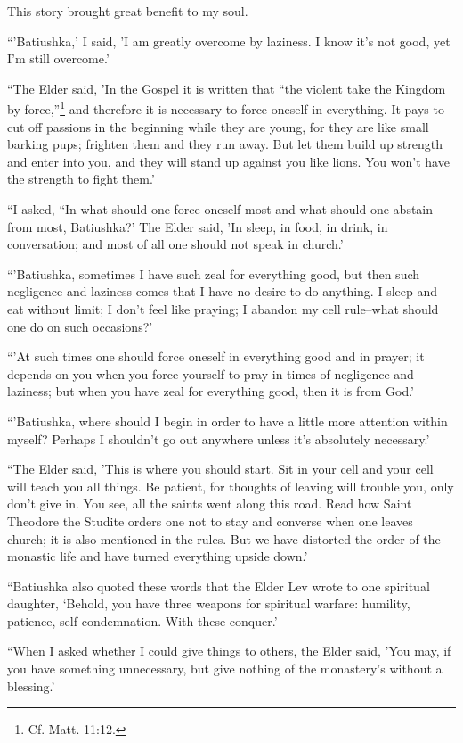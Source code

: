 This story brought great benefit to my soul.

“'Batiushka,' I said, 'I am greatly overcome by laziness. I know it's not good, yet I'm still overcome.'

“The Elder said, 'In the Gospel it is written that “the violent take the Kingdom by force,''\footnote{Cf. Matt. 11:12.} and therefore it is necessary to force oneself in everything. It pays to cut off passions in the beginning while they are young, for they are like small barking pups; frighten them and they run away. But let them build up strength and enter into you, and they will stand up against you like lions. You won't have the strength to fight them.'

“I asked, “In what should one force oneself most and what should one abstain from most, Batiushka?' The Elder said, 'In sleep, in food, in drink, in conversation; and most of all one should not speak in church.'

“'Batiushka, sometimes I have such zeal for everything good, but then such negligence and laziness comes that I have no desire to do anything. I sleep and eat without limit; I don't feel like praying; I abandon my cell rule--what should one do on such occasions?'

“'At such times one should force oneself in everything good and in prayer; it depends on you when you force yourself to pray in times of negligence and laziness; but when you have zeal for everything good, then it is from God.'

“'Batiushka, where should I begin in order to have a little more attention within myself? Perhaps I shouldn't go out anywhere unless it's absolutely necessary.'

“The Elder said, 'This is where you should start. Sit in your cell and your cell will teach you all things. Be patient, for thoughts of leaving will trouble you, only don't give in. You see, all the saints went along this road. Read how Saint Theodore the Studite orders one not to stay and converse when one leaves church; it is also mentioned in the rules. But we have distorted the order of the monastic life and have turned everything upside down.'

“Batiushka also quoted these words that the Elder Lev wrote to one spiritual daughter, ‘Behold, you have three weapons for spiritual warfare: humility, patience, self-condemnation. With these conquer.'

“When I asked whether I could give things to others, the Elder said, 'You may, if you have something unnecessary, but give nothing of the monastery's without a blessing.'

